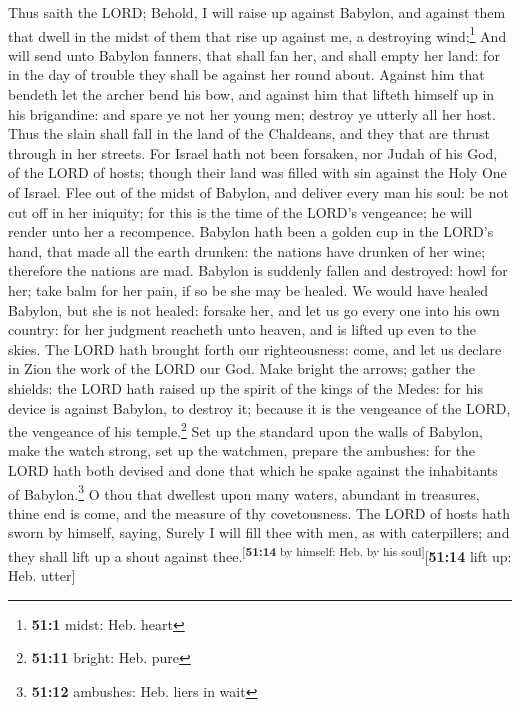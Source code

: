  Thus saith the LORD; Behold, I will raise up against
Babylon, and against them that dwell in the midst of them that rise up
against me, a destroying wind;\footnote{\textbf{51:1} midst: Heb. heart}
 And will send unto Babylon fanners, that shall fan her,
and shall empty her land: for in the day of trouble they shall be
against her round about.  Against him that bendeth let the
archer bend his bow, and against him that lifteth himself up in his
brigandine: and spare ye not her young men; destroy ye utterly all her
host.  Thus the slain shall fall in the land of the
Chaldeans, and they that are thrust through in her streets.
 For Israel hath not been forsaken, nor Judah of his God,
of the LORD of hosts; though their land was filled with sin against the
Holy One of Israel.  Flee out of the midst of Babylon, and
deliver every man his soul: be not cut off in her iniquity; for this is
the time of the LORD's vengeance; he will render unto her a recompence.
 Babylon hath been a golden cup in the LORD's hand, that
made all the earth drunken: the nations have drunken of her wine;
therefore the nations are mad.  Babylon is suddenly fallen
and destroyed: howl for her; take balm for her pain, if so be she may be
healed.  We would have healed Babylon, but she is not
healed: forsake her, and let us go every one into his own country: for
her judgment reacheth unto heaven, and is lifted up even to the skies.
 The LORD hath brought forth our righteousness: come, and
let us declare in Zion the work of the LORD our God. 
Make bright the arrows; gather the shields: the LORD hath raised up the
spirit of the kings of the Medes: for his device is against Babylon, to
destroy it; because it is the vengeance of the LORD, the vengeance of
his temple.\footnote{\textbf{51:11} bright: Heb. pure} 
Set up the standard upon the walls of Babylon, make the watch strong,
set up the watchmen, prepare the ambushes: for the LORD hath both
devised and done that which he spake against the inhabitants of
Babylon.\footnote{\textbf{51:12} ambushes: Heb. liers in wait}
 O thou that dwellest upon many waters, abundant in
treasures, thine end is come, and the measure of thy covetousness.
 The LORD of hosts hath sworn by himself, saying, Surely
I will fill thee with men, as with caterpillers; and they shall lift up
a shout against thee.\textsuperscript{{[}\textbf{51:14} by himself: Heb.
by his soul{]}}{[}\textbf{51:14} lift up: Heb. utter{]} 
